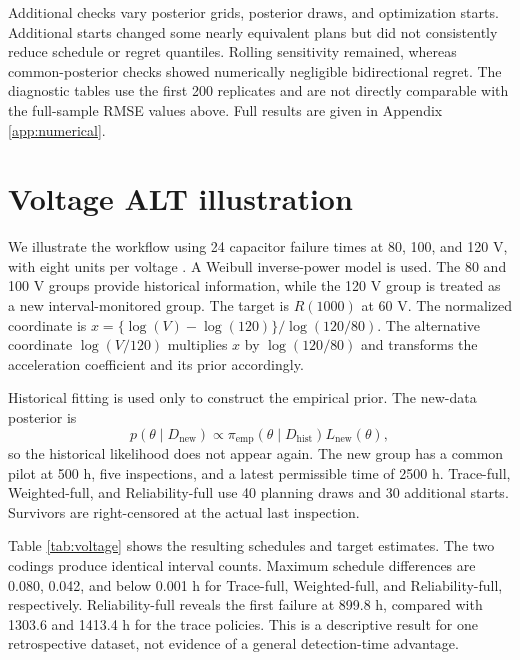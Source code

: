 \documentclass[a4paper,fleqn]{cas-sc}
\begin{document}
Additional checks vary posterior grids, posterior draws, and optimization starts. Additional starts changed some nearly equivalent plans but did not consistently reduce schedule or regret quantiles. Rolling sensitivity remained, whereas common-posterior checks showed numerically negligible bidirectional regret. The diagnostic tables use the first 200 replicates and are not directly comparable with the full-sample RMSE values above. Full results are given in Appendix \ref{app:numerical}.

\section{Voltage ALT illustration}
\label{sec:voltage}

We illustrate the workflow using 24 capacitor failure times at 80, 100, and 120 V, with eight units per voltage \citep{yang2007}. A Weibull inverse-power model is used. The 80 and 100 V groups provide historical information, while the 120 V group is treated as a new interval-monitored group. The target is $R(1000)$ at 60 V. The normalized coordinate is $x=\{\log(V)-\log(120)\}/\log(120/80)$. The alternative coordinate $\log(V/120)$ multiplies $x$ by $\log(120/80)$ and transforms the acceleration coefficient and its prior accordingly.

Historical fitting is used only to construct the empirical prior. The new-data posterior is
\begin{equation}
p(\theta\mid D_{\mathrm{new}})\propto
\pi_{\mathrm{emp}}(\theta\mid D_{\mathrm{hist}})L_{\mathrm{new}}(\theta),
\end{equation}
so the historical likelihood does not appear again. The new group has a common pilot at 500 h, five inspections, and a latest permissible time of 2500 h. Trace-full, Weighted-full, and Reliability-full use 40 planning draws and 30 additional starts. Survivors are right-censored at the actual last inspection.

Table \ref{tab:voltage} shows the resulting schedules and target estimates. The two codings produce identical interval counts. Maximum schedule differences are 0.080, 0.042, and below 0.001 h for Trace-full, Weighted-full, and Reliability-full, respectively. Reliability-full reveals the first failure at 899.8 h, compared with 1303.6 and 1413.4 h for the trace policies. This is a descriptive result for one retrospective dataset, not evidence of a general detection-time advantage.

\begin{table}[t]
\centering
\caption{Voltage ALT plans. The target is $h=\log\{-\log R(1000)\}$ at 60 V. Schedules are shown for the normalized coding. Max. schedule $\Delta t$ compares the normalized and log-ratio codings. No failure had occurred at the 500 h pilot.}
\label{tab:voltage}
\resizebox{\textwidth}{!}{}
\end{table}
\end{document}
